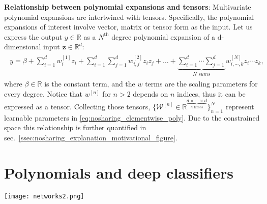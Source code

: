 \documentclass[runningheads]{llncs}
\newcommand{\noshare}{PDC}
\newcommand{\realnum}{\mathbb{R}}
\providecommand{\bmcal}[1]{\bm{\mathcal{#1}}}
\providecommand{\invar}{z}
\providecommand{\binvar}{\bm{\invar}}
\providecommand\eg{e.g.,}
\providecommand\ie{i.e.,}
\begin{document}
\noindent\textbf{Relationship between polynomial expansions and tensors}: Multivariate polynomial expansions are intertwined with tensors. Specifically, the polynomial expansions of interest involve vector, matrix or tensor form as the input. 
Let us express the output $y \in \realnum$  as a $N^{\text{th}}$ degree polynomial expansion of a d-dimensional input $\binvar \in \realnum^d$:
\begin{align}
    \begin{split}
        y = \beta + \sum_{i=1}^d w^{[1]}_i \invar_i + \sum_{i=1}^d \sum_{j=1}^d w^{[2]}_{i, j} \invar_i \invar_j + \ldots + 
        \underbrace{\sum_{i=1}^d \cdots \sum_{j=1}^d}_{N \textit{ sums}} w^{[N]}_{i, \cdots, k} \invar_i \cdots \invar_k,
    \end{split}
    \label{eq:nosharing_elementwise_poly}
\end{align}
where $\beta \in \realnum$ is the constant term, and the $w$ terms are the scaling parameters for every degree. Notice that $w^{[n]}$ for $n > 2$ depends on $n$ indices, thus it can be expressed as a tensor. Collecting those tensors, $\{\bmcal{W}^{[n]} \in \realnum^{\underbrace{d \times \cdots \times d}_{n \textit{ times}}}\}_{n=1}^N$ represent learnable parameters in \eqref{eq:nosharing_elementwise_poly}. Due to the constrained space this relationship is further quantified in sec.~\ref{ssec:nosharing_explanation_motivational_figure}.



 \section{Polynomials and deep classifiers}
\label{sec:nosharing_taxonomy}




  

 

\begin{figure*}[t!]
  \centering
    \texttt{[image: networks2.png]}
    \caption{Blocks (up to third-degree) from different architectures. The layers (\ie{} blue boxes) denote any linear operation, \eg{} a convolution or a fully-connected layer, depending on the architecture. From left to right, the degree of the polynomial is increasing. Our framework enables also to complete the missing terms of the polynomial (\ie{} \noshare-NL versus NL). }
  \label{fig:nosharing_blocks}
\end{figure*}
\end{document}
